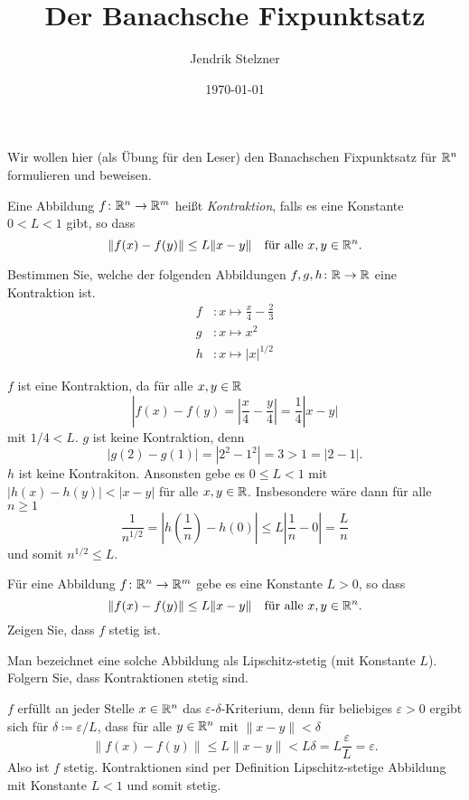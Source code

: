 \documentclass[a4paper,10pt]{article}
\title{Der Banachsche Fixpunktsatz}
\author{Jendrik Stelzner}
\date{\today}
\begin{document}
\maketitle


Wir wollen hier (als Übung für den Leser) den Banachschen Fixpunktsatz für $\mathbb{R}^n$ formulieren und beweisen.


\begin{defi}
 Eine Abbildung $f \colon \mathbb{R}^n \to \mathbb{R}^m$ heißt \emph{Kontraktion}, falls es eine Konstante $0 < L < 1$ gibt, so dass
 \[
  \|f(x)-f(y)\| \leq L\|x-y\| \quad \text{für alle $x,y \in \mathbb{R}^n$}.
 \]
\end{defi}


\begin{question}
 Bestimmen Sie, welche der folgenden Abbildungen $f, g, h \colon \mathbb{R} \to \mathbb{R}$ eine Kontraktion ist.
 \begin{align*}
  f&: x \mapsto \frac{x}{4} - \frac{2}{3} \\
  g&: x \mapsto x^2 \\
  h&: x \mapsto |x|^{1/2}
 \end{align*}
\end{question}
\begin{solution}
 $f$ ist eine Kontraktion, da für alle $x,y \in \mathbb{R}$
 \[
  |f(x)-f(y) = \left| \frac{x}{4} - \frac{y}{4} \right| = \frac{1}{4}|x-y|
 \]
 mit $1/4 < L$.
 $g$ ist keine Kontraktion, denn
 \[
  |g(2)-g(1)| = |2^2 - 1^2| = 3 > 1 = |2-1|.
 \]
 $h$ ist keine Kontrakiton. Ansonsten gebe es $0 \leq L < 1$ mit $|h(x)-h(y)| < |x-y|$ für alle $x, y \in \mathbb{R}$. Insbesondere wäre dann für alle $n \geq 1$
 \[
  \frac{1}{n^{1/2}}
  = \left|h\left(\frac{1}{n}\right) - h(0)\right|
  \leq L\left| \frac{1}{n} - 0\right|
  = \frac{L}{n}
 \]
 und somit $n^{1/2} \leq L$.
\end{solution}


\begin{question}
 Für eine Abbildung $f \colon \mathbb{R}^n \to \mathbb{R}^m$ gebe es eine Konstante $L > 0$, so dass
 \[
  \|f(x)-f(y)\| \leq L\|x-y\| \quad \text{für alle $x,y \in \mathbb{R}^n$}.
 \]
 Zeigen Sie, dass $f$ stetig ist.
 
 Man bezeichnet eine solche Abbildung als Lipschitz-stetig (mit Konstante $L$). Folgern Sie, dass Kontraktionen stetig sind.
\end{question}
\begin{solution}
 $f$ erfüllt an jeder Stelle $x \in \mathbb{R}^n$ das $\varepsilon$-$\delta$-Kriterium, denn für beliebiges $\varepsilon > 0$ ergibt sich für $\delta \coloneqq \varepsilon/L$, dass für alle $y \in \mathbb{R}^n$ mit $\|x-y\| < \delta$
 \[
  \|f(x)-f(y)\| \leq L\|x-y\| < L\delta = L \frac{\varepsilon}{L} = \varepsilon.
 \]
 Also ist $f$ stetig. Kontraktionen sind per Definition Lipschitz-stetige Abbildung mit Konstante $L < 1$ und somit stetig.
\end{solution}
\end{document}
